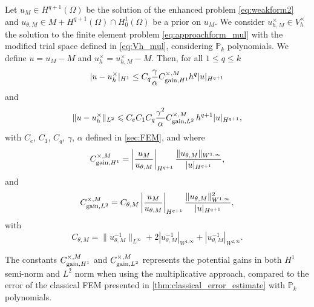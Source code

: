 \begin{theorem}
	\label{lem:error_estimate_multiplicative}
	Let $u_M\in H^{q+1}(\Omega)$ be the solution of the enhanced problem \eqref{eq:weakform2}
    and $u_{\theta,M}\in M+H^{q+1}(\Omega)\cap H^1_0(\Omega)$ be a prior on $u_M$.
    We consider $u_{h,M}^\times\in V_h^\times$ the solution to the finite element problem \eqref{eq:approachform_mul} with
     the modified trial space defined in \eqref{eq:Vh_mul},
    considering $\mathbb{P}_k$ polynomials.
    We define $u=u_M-M$ and $u_h^\times=u_{h,M}^\times-M$.
    Then, for all $1\leqslant q\leqslant k$
	\begin{equation*}
		\label{eq:error_mul}
		| u-u_h^\times|_{H^1} \leq C_q\dfrac{\gamma}{\alpha} C_{\text{\rm gain},H^1}^{\times,M} h^{q}| u |_{H^{q+1}}
	\end{equation*}
	and
	\begin{equation*}
        \label{eq:error_mulL2}
        \| u-u_h^\times\|_{L^2} \leqslant C_e C_1 C_q\dfrac{\gamma^2}{\alpha} C_{\text{\rm gain},L^2}^{\times,M} \, h^{q+1} |u|_{H^{q+1}},
    \end{equation*}
    with $C_e$, $C_1$, $C_q$, $\gamma$, $\alpha$ defined in \cref{sec:FEM}, and where
    \begin{equation}
		\label{eq:gain_mul}
		C_{\text{\rm gain},H^1}^{\times,M} = \left| \frac{u_M}{u_{\theta,M}} \right|_{H^{q+1}} \frac{\| u_{\theta,M}\|_{W^{1,\infty}}}{| u |_{H^{q+1}}},
	\end{equation}
	and
    \begin{equation}
		\label{eq:gain_mulL2}
		C_{\text{\rm gain},L^2}^{\times,M} =
		C_{\theta,M}\left| \frac{u_M}{u_{\theta,M}} \right|_{H^{q+1}} \frac{\| u_{\theta,M}\|_{W^{1,\infty}}^2}{| u |_{H^{q+1}}},
	\end{equation}
	with
    \begin{equation}
		\label{eq:CthetaM}C_{\theta,M}=\|u_{\theta,M}^{-1}\|_{L^{\infty}}
		+2|u_{\theta,M}^{-1}|_{W^{1,\infty}}
		+|u_{\theta,M}^{-1}|_{W^{2,\infty}}.
	\end{equation}
\end{theorem}

\begin{remark}\label{rmk:gain_mul}
The constants $C_{\text{\rm gain},H^1}^{\times,M}$ and $C_{\text{\rm gain},L^2}^{\times,M}$
represents the potential gains in both $H^1$ semi-norm and $L^2$ norm
when using the multiplicative approach, compared
to the error of the classical FEM presented in \cref{thm:classical_error_estimate} with $\mathbb{P}_k$ polynomials.
\end{remark}

